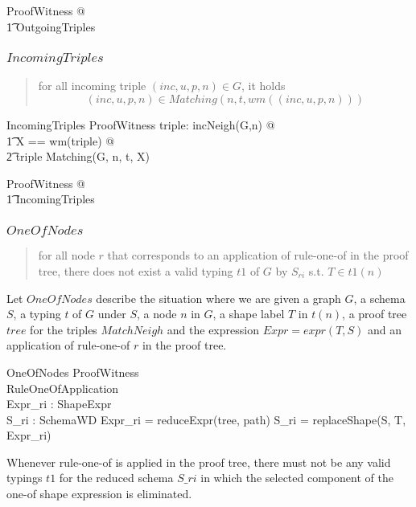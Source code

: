 \documentclass{article}
\begin{document}
\begin{zed}
	\forall ProofWitness @ \\
\t1		OutgoingTriples
\end{zed}

\subsubsection{$IncomingTriples$}
\begin{quote}
for all incoming triple $(inc, u, p, n) \in G$, it holds
\[
(inc, u, p, n) \in Matching(n, t, wm((inc, u, p, n)))
\]
\end{quote}
\begin{schema}{IncomingTriples}
	ProofWitness
\where
	\forall triple: incNeigh(G,n) @ \\
\t1		\LET X == wm(triple) @ \\
\t2			triple \in Matching(G, n, t, X)
\end{schema}

\begin{zed}
	\forall ProofWitness @ \\
\t1		IncomingTriples
\end{zed}

\subsubsection{$OneOfNodes$}
\begin{quote}
for all node $r$ that corresponds to an application of rule-one-of in the proof tree, 
there does not exist a valid typing $t1$ of $G$ by $S_{ri}$ s.t. $T \in t1(n)$
\end{quote}

Let $OneOfNodes$ describe the situation where we are
given a graph $G$, a schema $S$, a typing $t$ of $G$ under $S$, a node $n$ in $G$, a shape label $T$
in $t(n)$, a proof tree $tree$ for the triples $MatchNeigh$ and the expression $Expr= expr(T,S)$ and an application
of rule-one-of $r$ in the proof tree.

\begin{schema}{OneOfNodes}
	ProofWitness \\
	RuleOneOfApplication \\
	Expr\_ri : ShapeExpr \\
	S\_ri : SchemaWD
\where
	Expr\_ri = reduceExpr(tree, path)
\also
	S\_ri = replaceShape(S, T, Expr\_ri)
\end{schema}

Whenever rule-one-of is applied in the proof tree, there must not be any valid typings $t1$
for the reduced schema $S\_ri$ in which the selected component of the one-of shape expression is eliminated.
\end{document}
